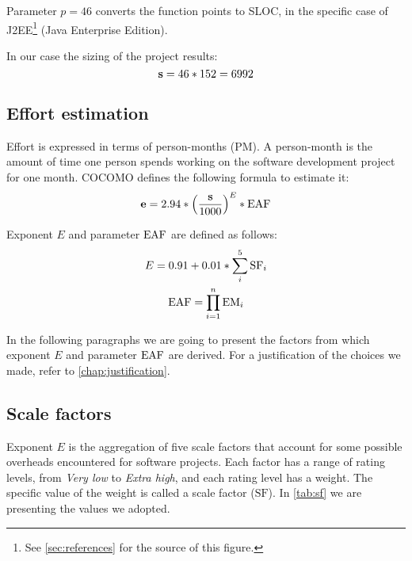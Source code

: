 Parameter $ p = 46 $ converts the function points to SLOC, in the specific case of J2EE\footnote{See \cref{sec:references} for the source of this figure.} (Java Enterprise Edition).

In our case the sizing of the project results:
\begin{equation}
%
	\mSize = 46 * 152 = 6992
%
\end{equation}



\subsection{Effort estimation}

Effort is expressed in terms of \mbox{person-months} (PM). A \mbox{person-month} is the amount of time one person spends working on the software development project for one month. COCOMO defines the following formula to estimate it:
\begin{equation}
%
	\mEffort = 2.94 * { \left( \frac{\mSize}{1000} \right) }^{E} * \eaf \label{eqn:effort}
%
\end{equation}


Exponent $ E $ and parameter $ \text{EAF} $ are defined as follows:
\begin{gather}
%
	E = 0.91 + 0.01 * \sum_{i}^{5} \text{SF}_i \label{eqn:Eexp}\\%
%
	\eaf     = \prod_{i=1}^{n} \text{EM}_i \label{eqn:eaf}
%
\end{gather}




In the following paragraphs we are going to present the factors from which exponent $ E $ and parameter $ \text{EAF} $ are derived. For a justification of the choices we made, refer to \cref{chap:justification}.









\subsection*{Scale factors} Exponent $ E $ is the aggregation of five scale factors that account for some possible overheads encountered for software projects. Each factor has a range of rating levels, from \emph{Very low} to \emph{Extra high}, and each rating level has a weight. The specific value of the weight is called a scale factor ($ \text{SF} $). In \cref{tab:sf} we are presenting the values we adopted.



